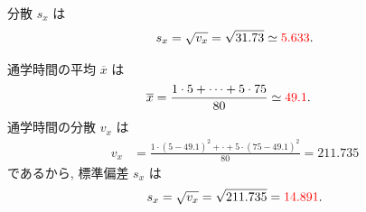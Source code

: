 \begin{qenumerate}
{\begin{enumerate}
{				分散 $s_{x}$ は
				\begin{align}
					s_{x} = \sqrt{v_{x}} = \sqrt{31.73} \simeq \textcolor{red}{5.633}.
				\end{align}
			}
		\end{enumerate}
	}
	\item{
		通学時間の平均 $\overline{x}$ は
		\begin{align}
			\overline{x} &= \frac{1\cdot 5 + \cdots + 5\cdot 75}{80} \simeq \textcolor{red}{49.1}.
		\end{align}
		通学時間の分散 $v_{x}$ は
		\begin{align}
			v_{x} &= \frac{1\cdot (5 - 49.1)^{2} + \cdot + 5\cdot (75 - 49.1)^{2}}{80} = 211.735
		\end{align}
		であるから, 標準偏差 $s_{x}$ は
		\begin{align}
			s_{x} = \sqrt{v_{x}} = \sqrt{211.735} = \textcolor{red}{14.891}.
		\end{align}
	}
\end{qenumerate}

